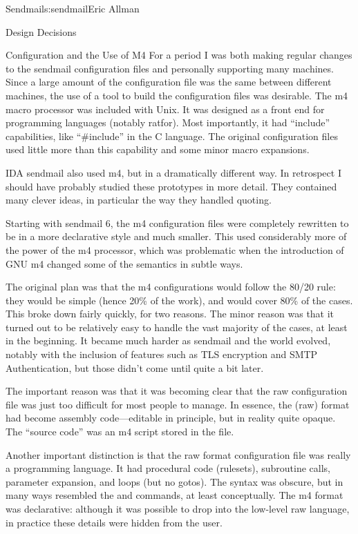 \begin{aosachapter}{Sendmail}{s:sendmail}{Eric Allman}
\begin{aosasect1}{Design Decisions}
\begin{aosasect2}{Configuration and the Use of M4}
For a period I was both making regular changes to the sendmail
configuration files and personally supporting many machines. Since a
large amount of the configuration file was the same between different
machines, the use of a tool to build the configuration files was
desirable. The m4 macro processor was included with Unix. It was
designed as a front end for programming languages (notably
ratfor). Most importantly, it had ``include'' capabilities, like
``\#include'' in the C language.
The original configuration files used little
more than this capability and some minor macro expansions.

IDA sendmail also used m4, but in a dramatically different way. In
retrospect I should have probably studied these prototypes in more
detail. They contained many clever ideas, in particular the way they
handled quoting.

Starting with sendmail 6, the m4 configuration files were completely
rewritten to be in a more declarative style and much smaller. This
used considerably more of the power of the m4 processor, which was
problematic when the introduction of GNU m4 changed some of
the semantics in subtle ways.

The original plan was that the m4
configurations would follow the 80/20 rule: they would be simple
(hence 20\% of the work), and would cover 80\% of the cases. This broke
down fairly quickly, for two reasons.
The minor reason was that it turned out to be relatively easy to
handle the vast majority of the cases, at least in the beginning. It
became much harder as sendmail and the world evolved, notably with the
inclusion of features such as TLS encryption and SMTP Authentication,
but those didn't come until quite a bit later.

The important reason was that it was becoming clear that the raw
configuration file was just too difficult for most people to
manage. In essence, the  (raw) format had become assembly
code---editable in principle, but in reality quite opaque. The
``source code'' was an m4 script stored in the  file.

Another important distinction is that the raw format configuration
file was really a programming language. It had procedural code
(rulesets), subroutine calls, parameter expansion, and loops (but no
gotos). The syntax was obscure, but in many ways resembled
the  and  commands, at
least conceptually. The m4 format was declarative: although it was
possible to drop into the low-level raw language, in practice these
details were hidden from the user.


\end{aosasect2}
\end{aosasect1}
\end{aosachapter}
